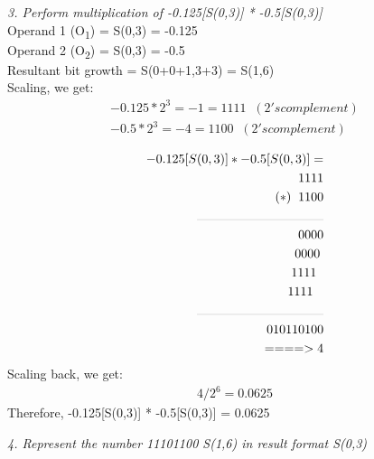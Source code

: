 \documentclass[a4paper]{article}
\begin{document}
\bigskip
\textit{3. Perform multiplication of -0.125[S(0,3)] * -0.5[S(0,3)] }\\
\bigskip
Operand 1 (O\textsubscript1) = S(0,3) = -0.125\\
Operand 2 (O\textsubscript2) = S(0,3) = -0.5\\
Resultant bit growth = S(0+0+1,3+3) = S(1,6)\\
\medskip
Scaling, we get:
\begin{gather*} 
-0.125 * 2^3 = -1 = 1111 \;\; (2's complement)\\
-0.5 * 2^3 = -4 = 1100 \;\; (2's complement)\\
\end{gather*}
\vspace{-20pt}
\begin{align*} 
-0.125[S(0,3)] * -0.5[S(0,3)] =\\ 
1111\\
(*)  \;\;1100\\
\rule{100pt}{0.1pt}\\
0000\\
0000\;\\
1111\;\;\\
1111\;\;\;\\
\rule{100pt}{0.1pt}\\
01011 0100\\
====> 4
\end{align*}
Scaling back, we get:
\begin{gather*} 
4/2^6 = 0.0625
\end{gather*}
Therefore, -0.125[S(0,3)] * -0.5[S(0,3)] = 0.0625

\bigskip
\textit{4. Represent the number 11101100 S(1,6) in result format S(0,3)}\\
\bigskip
\end{document}
